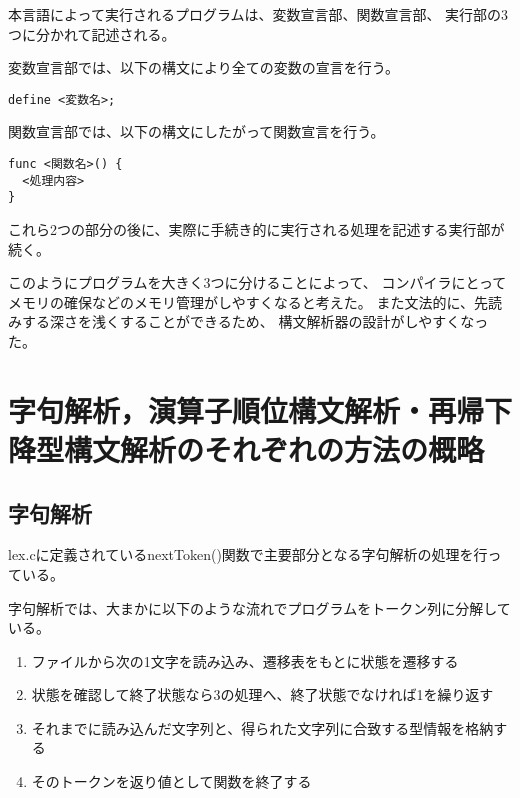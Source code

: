 \documentclass[11pt,a4j]{jarticle}
\begin{document}
本言語によって実行されるプログラムは、変数宣言部、関数宣言部、
実行部の3つに分かれて記述される。

変数宣言部では、以下の構文により全ての変数の宣言を行う。

\begin{verbatim}
define <変数名>;
\end{verbatim}

関数宣言部では、以下の構文にしたがって関数宣言を行う。

\begin{verbatim}
func <関数名>() {
  <処理内容>
}
\end{verbatim}


これら2つの部分の後に、実際に手続き的に実行される処理を記述する実行部が続く。

このようにプログラムを大きく3つに分けることによって、
コンパイラにとってメモリの確保などのメモリ管理がしやすくなると考えた。
また文法的に、先読みする深さを浅くすることができるため、
構文解析器の設計がしやすくなった。




\section{字句解析，演算子順位構文解析・再帰下降型構文解析のそれぞれの方法の概略}

\subsection{字句解析}

lex.cに定義されているnextToken()関数で主要部分となる字句解析の処理を行っている。

字句解析では、大まかに以下のような流れでプログラムをトークン列に分解している。

\begin{enumerate}
  \item ファイルから次の1文字を読み込み、遷移表をもとに状態を遷移する
  \item 状態を確認して終了状態なら3の処理へ、終了状態でなければ1を繰り返す
  \item それまでに読み込んだ文字列と、得られた文字列に合致する型情報を格納する
  \item そのトークンを返り値として関数を終了する
\end{enumerate}

\end{document}
